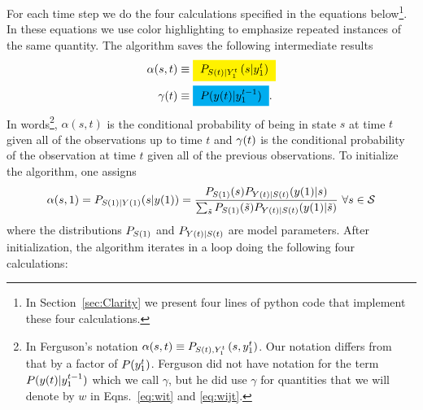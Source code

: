 For each time step we do the four calculations specified in the
equations below\footnote{In Section~\ref{sec:Clarity} we present four
  lines of python code that implement these four calculations.}.  In
these equations we use color highlighting to emphasize repeated
instances of the same quantity.  The algorithm saves the following
intermediate results
%
%
\begin{align}
  \label{eq:alpha}
  \alpha(s,t) &\equiv \alphax{t}{s}\\
  \label{eq:gamma}
  \ti{\gamma}{t} &\equiv \gammax .
\end{align}
In words\footnote{In Ferguson's notation $\alpha(s,t) \equiv
  P_{{S}{(t)},Y_{1}^{t}} \left(s,y_{1}^{t} \right)$.  Our
  notation differs from that by a factor of $P(y_{1}^{t})$.
  Ferguson did not have notation for the term
  $P({y}{(t)}|y_{1}^{t-1})$ which we call $\gamma$, but he did use
  $\gamma$ for quantities that we will denote by $w$ in
  Eqns.~\eqref{eq:wit} and \eqref{eq:wijt}.}, $\alpha(s,t)$ is the
conditional probability of being in state $s$ at time $t$ given all
of the observations up to time $t$ and ${\gamma}{(t)}$ is the
conditional probability of the observation at time $t$ given all of
the previous observations.  To initialize the algorithm, one assigns
\begin{equation*}
\alpha(s,1) = P_{\ti{S}{1}|\ti{Y}{1}}(s|\ti{y}{1}) =
\frac{P_{\ti{S}{1}}(s)P_{\ti{Y}{t}|\ti{S}{t}}(\ti{y}{1}|s)}
{\sum_{{\tilde s}}P_{\ti{S}{1}}({\tilde s})P_{\ti{Y}{t}|\ti{S}{t}}(\ti{y}{1}|{\tilde s})}
~\forall s \in \states
\end{equation*}
where the distributions $P_{{S}{(1)}}$ and $P_{{Y}{(t)}|{S}{(t)}}$
are model parameters.  After initialization, the algorithm iterates in
a loop doing the following four calculations: 
